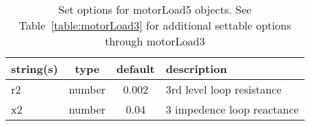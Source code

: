 \begin{table}[ht]
\centering
\begin{tabular}{p{5cm} c c p{7cm}}
\hline
string(s) & type & default & description \\
\hline
r2 & number & 0.002 & 3rd level loop resistance\\
x2 & number & 0.04 & 3 impedence loop reactance\\
\hline
\end{tabular}
\caption{Set options for motorLoad5 objects. See Table~\ref{table:motorLoad3} for additional settable options through motorLoad3}
\label{table:motorLoad5}
\end{table}

